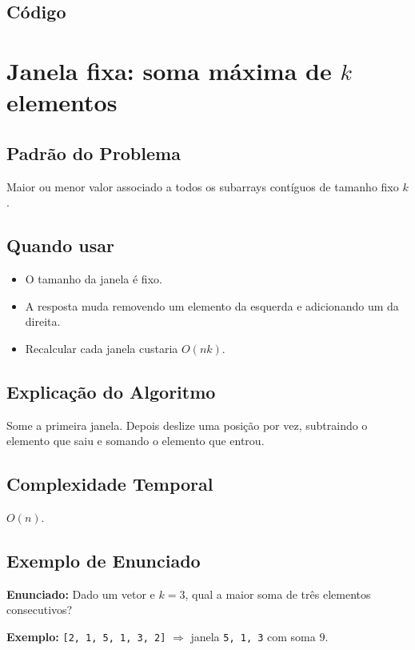 \subsection{Código}

\section{Janela fixa: soma máxima de $k$ elementos}

\subsection{Padrão do Problema}
Maior ou menor valor associado a todos os subarrays contíguos de tamanho fixo $k$.

\subsection{Quando usar}
\begin{itemize}[nosep]
  \item O tamanho da janela é fixo.
  \item A resposta muda removendo um elemento da esquerda e adicionando um da direita.
  \item Recalcular cada janela custaria $O(nk)$.
\end{itemize}

\subsection{Explicação do Algoritmo}
Some a primeira janela. Depois deslize uma posição por vez, subtraindo o elemento que saiu e somando o elemento que entrou.

\subsection{Complexidade Temporal}
$O(n)$.

\subsection{Exemplo de Enunciado}
\begin{exemplodiabox}
\textbf{Enunciado:} Dado um vetor e $k = 3$, qual a maior soma de três elementos consecutivos?

\textbf{Exemplo:} \texttt{[2, 1, 5, 1, 3, 2]} $\Rightarrow$ janela \texttt{5, 1, 3} com soma $9$.
\end{exemplodiabox}

